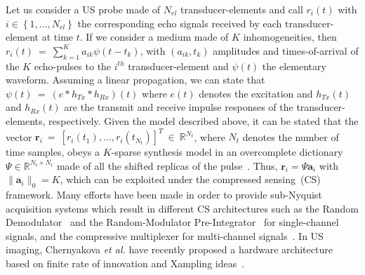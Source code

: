 \documentclass[9pt,conference]{IEEEtran}
\begin{document}

Let us consider a US probe made of $N_{el}$ transducer-elements and call $r_i \left(t\right)$ with $i \in \left\lbrace 1,...,N_{el}\right\rbrace$ the corresponding echo signals received by each transducer-element at time $t$. If we consider a medium made of $K$ inhomogeneities, then $r_i\left(t\right)~=~\sum_{k=1}^{K} a_{ik} \psi \left(t - t_{k}\right)$, with $\left(a_{ik}, t_{k}\right)$ amplitudes and times-of-arrival of the $K$ echo-pulses to the $i^{th}$ transducer-element and $\psi \left(t\right)$ the elementary waveform. Assuming a linear propagation, we can state that $\psi \left(t\right)~=~\left(e \ast h_{Tx} \ast h_{Rx}\right) \left(t\right)$ where $e\left(t\right)$ denotes the excitation and $ h_{Tx}\left(t\right)$ and $ h_{Rx}\left(t\right)$ are the transmit and receive impulse responses of the transducer-elements, respectively.
Given the model described above, it can be stated that the vector $\bm{r}_i~=~ \left[r_i \left(t_1\right), ..., r_i \left(t_{N_t}\right)\right]^T~\in~ \mathbb{R}^{N_t}$, where $N_t$ denotes the number of time samples, obeys a $K$-sparse synthesis model in an overcomplete dictionary $\mathsf{\Psi} \in \mathbb{R}^{N_t \times N_t}$ made of all the shifted replicas of the pulse~\cite{naini2009}. Thus, $\bm{r}_i = \mathsf{\Psi} \bm{a}_i$ with $\| \bm{a}_i \|_0 = K$, which can be exploited under the compressed sensing~(CS) framework. 
Many efforts have been made in order to provide sub-Nyquist acquisition systems which result in different CS architectures such as the Random Demodulator~\cite{tropp2010} and the Random-Modulator Pre-Integrator~\cite{becker2011} for single-channel signals, and the compressive multiplexer for multi-channel signals~\cite{slavinsky2011,kim2012}.
In US imaging, Chernyakova \textit{et al.} have recently proposed a hardware architecture based on finite rate of innovation and Xampling ideas~\cite{chernyakova2014}.
\end{document}
